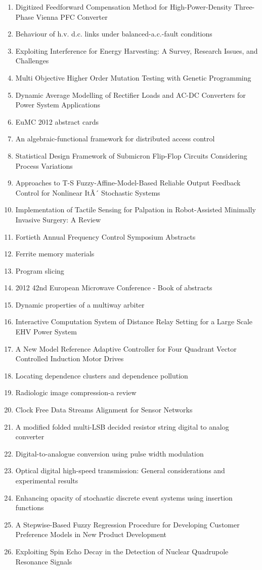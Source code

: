 \begin{enumerate}
\item Digitized Feedforward Compensation Method for High-Power-Density Three-Phase Vienna PFC Converter
\item Behaviour of h.v. d.c. links under balanced-a.c.-fault conditions
\item Exploiting Interference for Energy Harvesting: A Survey, Research Issues, and Challenges
\item Multi Objective Higher Order Mutation Testing with Genetic Programming
\item Dynamic Average Modelling of Rectifier Loads and AC-DC Converters for Power System Applications
\item EuMC 2012 abstract cards
\item An algebraic-functional framework for distributed access control
\item Statistical Design Framework of Submicron Flip-Flop Circuits Considering Process Variations
\item Approaches to T-S Fuzzy-Affine-Model-Based Reliable Output Feedback Control for Nonlinear ItÃ´ Stochastic Systems
\item Implementation of Tactile Sensing for Palpation in Robot-Assisted Minimally Invasive Surgery: A Review
\item Fortieth Annual Frequency Control Symposium Abstracts
\item Ferrite memory materials
\item Program slicing
\item 2012 42nd European Microwave Conference - Book of abstracts
\item Dynamic properties of a multiway arbiter
\item Interactive Computation System of Distance Relay Setting for a Large Scale EHV Power System
\item A New Model Reference Adaptive Controller for Four Quadrant Vector Controlled Induction Motor Drives
\item Locating dependence clusters and dependence pollution
\item Radiologic image compression-a review
\item Clock Free Data Streams Alignment for Sensor Networks
\item A modified folded multi-LSB decided resistor string digital to analog converter
\item Digital-to-analogue conversion using pulse width modulation
\item Optical digital high-speed transmission: General considerations and experimental results
\item Enhancing opacity of stochastic discrete event systems using insertion functions
\item A Stepwise-Based Fuzzy Regression Procedure for Developing Customer Preference Models in New Product Development
\item Exploiting Spin Echo Decay in the Detection of Nuclear Quadrupole Resonance Signals
\end{enumerate}

